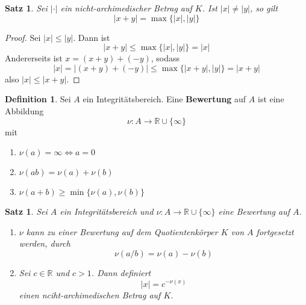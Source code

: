\documentclass[10pt,a4paper]{article}
\newcommand{\R}{\ensuremath{\mathbb{R}}}
\newcommand{\abs}[1]{\left|#1\right|}
\theoremstyle{plain}
\newtheorem{satz}[theorem]{Satz}
\theoremstyle{definition}
\newtheorem{definition}[theorem]{Definition}
\theoremstyle{remark}
\begin{document}
	\begin{satz}
		Sei $\abs\cdot$ ein  nicht-archimedischer Betrag auf $K$. Ist $\abs x\neq \abs y$, so gilt
		\[\abs{x+y}=\max\{\abs x,\abs y\}\]
	\end{satz}
	\begin{proof}
		Sei $\abs x\leq \abs y$. Dann ist 
		\[\abs{x+y}\leq\max\{\abs x,\abs y\}=\abs x\]
		Andererseits ist $x=(x+y)+(-y)$, sodass
		\[\abs x=\abs{(x+y)+(-y)}\leq\max\{\abs{x+y},\abs y\}=\abs{x+y}\]
		also $\abs x\leq\abs{x+y}$.
	\end{proof}

	\begin{definition}
		Sei $A$ ein Integritätsbereich. Eine \textbf{Bewertung} auf $A$ ist eine Abbildung
		\[\nu:A\to\R\cup\{\infty\}\]
		mit
		\begin{enumerate}
			\item $\nu(a)=\infty\Leftrightarrow a=0$
			\item $\nu(ab)=\nu(a)+\nu(b)$
			\item $\nu(a+b)\geq\min\{\nu(a),\nu(b)\}$
		\end{enumerate}
	\end{definition}

	\begin{satz}
		Sei $A$ ein Integritätsbereich und $\nu:A\to\R\cup\{\infty\}$ eine Bewertung auf $A$.
		\begin{enumerate}
			\item $\nu$ kann zu einer Bewertung auf dem Quotientenkörper $K$ von $A$ fortgesetzt werden, durch
			\[\nu(a/b)=\nu(a)-\nu(b)\]
			\item Sei $c\in\R$ und $c> 1$. Dann definiert
			\[\abs{x}=c^{-\nu(x)}\]
			einen nciht-archimedischen Betrag auf $K$.
		\end{enumerate}
	\end{satz}
\end{document}
